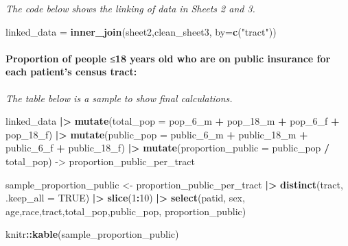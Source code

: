 \documentclass[
]{article}
\newenvironment{Shaded}{\begin{snugshade}}{\end{snugshade}}
\newcommand{\AttributeTok}[1]{\textcolor[rgb]{0.13,0.29,0.53}{#1}}
\newcommand{\ConstantTok}[1]{\textcolor[rgb]{0.56,0.35,0.01}{#1}}
\newcommand{\DecValTok}[1]{\textcolor[rgb]{0.00,0.00,0.81}{#1}}
\newcommand{\FunctionTok}[1]{\textcolor[rgb]{0.13,0.29,0.53}{\textbf{#1}}}
\newcommand{\NormalTok}[1]{#1}
\newcommand{\OtherTok}[1]{\textcolor[rgb]{0.56,0.35,0.01}{#1}}
\newcommand{\SpecialCharTok}[1]{\textcolor[rgb]{0.81,0.36,0.00}{\textbf{#1}}}
\newcommand{\StringTok}[1]{\textcolor[rgb]{0.31,0.60,0.02}{#1}}
\begin{document}
\emph{The code below shows the linking of data in Sheets 2 and 3.}

\begin{Shaded}
\begin{Highlighting}[]
\NormalTok{linked\_data }\OtherTok{=} 
  \FunctionTok{inner\_join}\NormalTok{(sheet2,clean\_sheet3, }\AttributeTok{by=}\FunctionTok{c}\NormalTok{(}\StringTok{"tract"}\NormalTok{))}
\end{Highlighting}
\end{Shaded}

\hypertarget{proportion-of-people-18-years-old-who-are-on-public-insurance-for-each-patients-census-tract}{%
\paragraph{Proportion of people ≤18 years old who are on public
insurance for each patient's census
tract:}\label{proportion-of-people-18-years-old-who-are-on-public-insurance-for-each-patients-census-tract}}

\emph{The table below is a sample to show final calculations.}

\begin{Shaded}
\begin{Highlighting}[]
\NormalTok{linked\_data }\SpecialCharTok{|\textgreater{}}
  \FunctionTok{mutate}\NormalTok{(}\AttributeTok{total\_pop =}\NormalTok{ pop\_6\_m }\SpecialCharTok{+}\NormalTok{ pop\_18\_m }\SpecialCharTok{+}\NormalTok{ pop\_6\_f }\SpecialCharTok{+}\NormalTok{ pop\_18\_f) }\SpecialCharTok{|\textgreater{}}
  \FunctionTok{mutate}\NormalTok{(}\AttributeTok{public\_pop =}\NormalTok{ public\_6\_m }\SpecialCharTok{+}\NormalTok{ public\_18\_m }\SpecialCharTok{+}\NormalTok{ public\_6\_f }\SpecialCharTok{+}\NormalTok{ public\_18\_f) }\SpecialCharTok{|\textgreater{}}
  \FunctionTok{mutate}\NormalTok{(}\AttributeTok{proportion\_public =}\NormalTok{ public\_pop }\SpecialCharTok{/}\NormalTok{ total\_pop) }\OtherTok{{-}\textgreater{}}\NormalTok{ proportion\_public\_per\_tract}

\NormalTok{sample\_proportion\_public }\OtherTok{\textless{}{-}}\NormalTok{ proportion\_public\_per\_tract }\SpecialCharTok{|\textgreater{}}
  \FunctionTok{distinct}\NormalTok{(tract, }\AttributeTok{.keep\_all =} \ConstantTok{TRUE}\NormalTok{) }\SpecialCharTok{|\textgreater{}}
  \FunctionTok{slice}\NormalTok{(}\DecValTok{1}\SpecialCharTok{:}\DecValTok{10}\NormalTok{) }\SpecialCharTok{|\textgreater{}} 
  \FunctionTok{select}\NormalTok{(patid, sex, age,race,tract,total\_pop,public\_pop, proportion\_public)}

\NormalTok{knitr}\SpecialCharTok{::}\FunctionTok{kable}\NormalTok{(sample\_proportion\_public)}
\end{Highlighting}
\end{Shaded}
\end{document}
